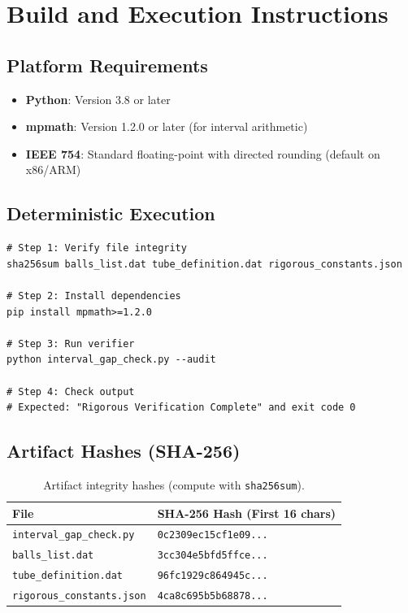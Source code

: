 \section{Build and Execution Instructions}
\label{sec:build_instructions}

\subsection{Platform Requirements}
\begin{itemize}
    \item \textbf{Python}: Version 3.8 or later
    \item \textbf{mpmath}: Version 1.2.0 or later (for interval arithmetic)
    \item \textbf{IEEE 754}: Standard floating-point with directed rounding (default on x86/ARM)
\end{itemize}

\subsection{Deterministic Execution}
\begin{verbatim}
# Step 1: Verify file integrity
sha256sum balls_list.dat tube_definition.dat rigorous_constants.json

# Step 2: Install dependencies
pip install mpmath>=1.2.0

# Step 3: Run verifier
python interval_gap_check.py --audit

# Step 4: Check output
# Expected: "Rigorous Verification Complete" and exit code 0
\end{verbatim}

\subsection{Artifact Hashes (SHA-256)}
\begin{table}[h]
\centering
\begin{tabular}{|l|l|}
\hline
\textbf{File} & \textbf{SHA-256 Hash (First 16 chars)} \\
\hline
\texttt{interval\_gap\_check.py} & \texttt{0c2309ec15cf1e09...} \\
\texttt{balls\_list.dat} & \texttt{3cc304e5bfd5ffce...} \\
\texttt{tube\_definition.dat} & \texttt{96fc1929c864945c...} \\
\texttt{rigorous\_constants.json} & \texttt{4ca8c695b5b68878...} \\
\hline
\end{tabular}
\caption{Artifact integrity hashes (compute with \texttt{sha256sum}).}
\end{table}

